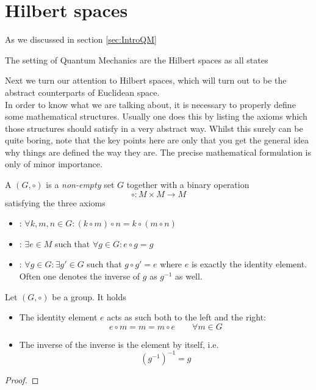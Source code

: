 \section{Hilbert spaces}
\label{sec:Hilbert}

As we discussed in section \vref{sec:IntroQM}



The setting of Quantum Mechanics are the Hilbert spaces
as all states 


Next we turn our attention to Hilbert spaces, which will turn out to be the abstract counterparts of Euclidean space. \\

In order to know what we are talking about, it is necessary to properly define some mathematical structures.
Usually one does this by listing the axioms which those structures should satisfy in a very abstract way.
Whilst this surely can be quite boring, note that the key points here are only that you get the general idea why things are defined the way they are. 
The precise mathematical formulation is only of minor importance.

\begin{defn}
	A  $(G, \circ)$ is a \emph{non-empty} set $G$
	together with a binary operation
	\[ \circ: M \times M \to M \]
	satisfying the three axioms
	\begin{itemize}
		\item {}: 
			$\forall k, m, n \in G: \left( k \circ m \right) \circ n = k \circ \left( m \circ n \right)$
		\item {}: $\exists e \in M$ such that $\forall g \in G:  e \circ g = g$
		\item {}:
			$\forall g \in G: \exists g' \in G$ such that $g \circ g' = e$
		where $e$ is exactly the identity element.
		Often one denotes the inverse of $g$ as $g^{-1}$ as well.
	\end{itemize}
\end{defn}

\begin{lem}
	Let $(G, \circ)$ be a group. It holds
	\begin{itemize}
		\item The identity element $e$ acts as such both to the left and the right:
			\[ e \circ m = m = m \circ e \qquad \forall m \in G \]
		\item The inverse of the inverse is the element by itself, i.e.
			\[ (g^{-1})^{-1} = g \]
	\end{itemize}
	\begin{proof}
	\end{proof}
\end{lem}

